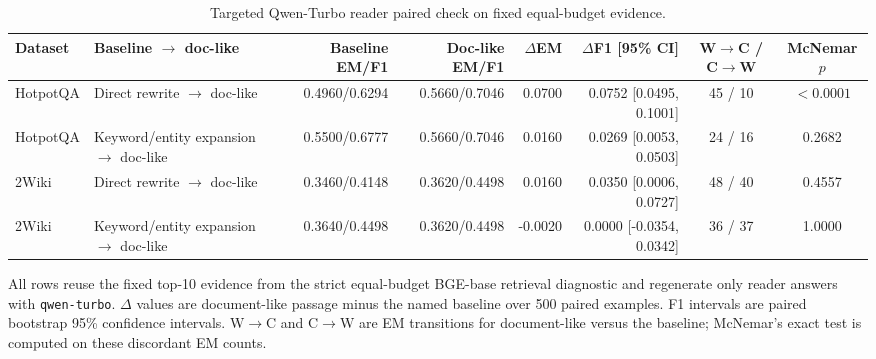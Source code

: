 \begin{table}[t]
\centering
\caption{Targeted Qwen-Turbo reader paired check on fixed equal-budget evidence.}
\label{tab:equal_budget_reader_check}
\scriptsize
\begin{threeparttable}
\setlength{\tabcolsep}{3pt}
\begin{tabularx}{\textwidth}{lXrrrrcc}
\toprule
Dataset & Baseline $\rightarrow$ doc-like & Baseline EM/F1 & Doc-like EM/F1 & $\Delta$EM & $\Delta$F1 [95\% CI] & W$\rightarrow$C / C$\rightarrow$W & McNemar $p$ \\
\midrule
HotpotQA & Direct rewrite $\rightarrow$ doc-like & 0.4960/0.6294 & 0.5660/0.7046 & 0.0700 & 0.0752 [0.0495, 0.1001] & 45 / 10 & $<0.0001$ \\
HotpotQA & Keyword/entity expansion $\rightarrow$ doc-like & 0.5500/0.6777 & 0.5660/0.7046 & 0.0160 & 0.0269 [0.0053, 0.0503] & 24 / 16 & 0.2682 \\
2Wiki & Direct rewrite $\rightarrow$ doc-like & 0.3460/0.4148 & 0.3620/0.4498 & 0.0160 & 0.0350 [0.0006, 0.0727] & 48 / 40 & 0.4557 \\
2Wiki & Keyword/entity expansion $\rightarrow$ doc-like & 0.3640/0.4498 & 0.3620/0.4498 & -0.0020 & 0.0000 [-0.0354, 0.0342] & 36 / 37 & 1.0000 \\
\bottomrule
\end{tabularx}
\begin{tablenotes}
\footnotesize
\item All rows reuse the fixed top-10 evidence from the strict equal-budget BGE-base retrieval diagnostic and regenerate only reader answers with \texttt{qwen-turbo}. $\Delta$ values are document-like passage minus the named baseline over 500 paired examples. F1 intervals are paired bootstrap 95\% confidence intervals. W$\rightarrow$C and C$\rightarrow$W are EM transitions for document-like versus the baseline; McNemar's exact test is computed on these discordant EM counts.
\end{tablenotes}
\end{threeparttable}
\end{table}
